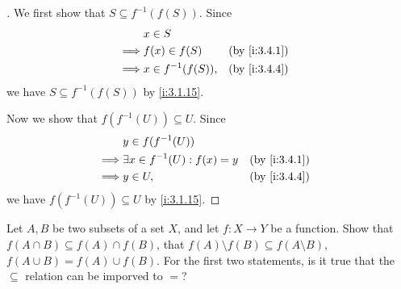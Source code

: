 \begin{proof}[]
  We first show that \(S \subseteq f^{-1}(f(S))\).
  Since
  \begin{align*}
             & x \in S                               \\
    \implies & f(x) \in f(S)       &  & \by{i:3.4.1} \\
    \implies & x \in f^{-1}(f(S)), &  & \by{i:3.4.4}
  \end{align*}
  we have \(S \subseteq f^{-1}(f(S))\) by \cref{i:3.1.15}.

  Now we show that \(f(f^{-1}(U)) \subseteq U\).
  Since
  \begin{align*}
             & y \in f(f^{-1}(U))                                   \\
    \implies & \exists x \in f^{-1}(U) : f(x) = y &  & \by{i:3.4.1} \\
    \implies & y \in U,                           &  & \by{i:3.4.4}
  \end{align*}
  we have \(f(f^{-1}(U)) \subseteq U\) by \cref{i:3.1.15}.
\end{proof}

\begin{ex}\label{i:ex:3.4.3}
  Let \(A, B\) be two subsets of a set \(X\), and let \(f : X \to Y\) be a function.
  Show that \(f(A \cap B) \subseteq f(A) \cap f(B)\), that \(f(A) \setminus f(B) \subseteq f(A \setminus B)\), \(f(A \cup B) = f(A) \cup f(B)\).
  For the first two statements, is it true that the \(\subseteq\) relation can be imporved to \(=\)?
\end{ex}

